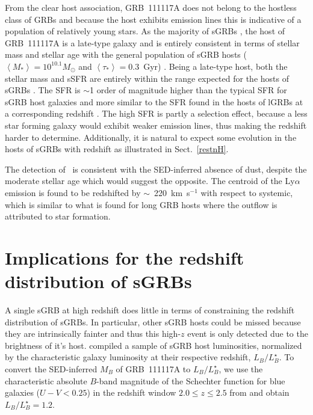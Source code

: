 \documentclass{aa}    %
\begin{document}
From the clear host association, GRB~111117A does not belong to the hostless
class of GRBs \citep{Berger2010a} and because the host exhibits emission lines
this is indicative of a population of relatively young stars.
As the majority of sGRBs \citep{Fong2013b}, the host of GRB~111117A is a
late-type galaxy and is entirely consistent in terms of stellar mass and stellar
age with the general population of sGRB hosts ($\left\langle M _*
\right\rangle = 10^{10.1} M_{\odot}$ and $\left\langle \tau _* \right\rangle =
0.3 $~Gyr) \citep{Leibler2010}. Being a late-type host, both the stellar mass
and sSFR are entirely within the range expected for the hosts of sGRBs
\citep{Behroozi2014}. The SFR is $\sim$1 order of magnitude higher than the
typical SFR for sGRB host galaxies \citep{Berger2014} and more similar to
the SFR found in the hosts of lGRBs at a corresponding redshift
\citep{Kruhler2015}. The high SFR is partly a selection effect, because a less
star forming galaxy would exhibit weaker emission lines, thus making the
redshift harder to determine. Additionally, it is natural to expect some
evolution in the hosts of sGRBs with redshift as illustrated in Sect.~\ref{restnH}. 

The detection of \lya~is consistent with the SED-inferred absence of dust,
despite the moderate stellar age which would suggest the opposite. The centroid
of the Ly$\alpha$ emission is found to be redshifted by $\sim$~220~km~s$^{-1}$
with respect to systemic, which is similar to what is found for long GRB hosts
\citep{Milvang-Jensen2012a} where the outflow is attributed to star formation.



\section{Implications for the redshift distribution of sGRBs}


A single sGRB at high redshift does little in terms of constraining the redshift
distribution of sGRBs. In particular, other sGRB hosts could be missed because
they are intrinsically fainter and thus this high-$z$ event is only detected due
to the brightness of it's host. \citet{Berger2014} compiled a sample of sGRB
host luminosities, normalized by the characteristic galaxy luminosity at their
respective redshift, $L_B/L^{\star}_{B}$. To convert the SED-inferred $M_B$ of
GRB~111117A to $L_B/L^{\star}_{B}$, we use the characteristic absolute $B$-band
magnitude of the Schechter function for blue galaxies ($U - V < 0.25$) in the
redshift window $2.0 \leq z \leq 2.5$ from \citet{Marchesini2007} and obtain
$L_B/L^{\star}_{B} = 1.2$. 
\end{document}
